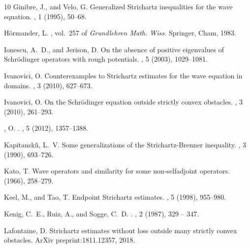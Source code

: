 \documentclass[10pt,leqno]{amsart}
\theoremstyle{definition}%
\theoremstyle{remark}
\numberwithin{equation}{section}
\renewcommand{\^}{\widehat}%
\begin{document}
\begin{thebibliography}{10}
{\sc Ginibre, J., and Velo, G.}
\newblock Generalized {S}trichartz inequalities for the wave equation.
, 1 (1995), 50--68.

{\sc H{\"o}rmander, L.}
, vol.~257 of {\em
  Grundlehren Math. Wiss.}
\newblock Springer, Cham, 1983.

{\sc Ionescu, A.~D., and Jerison, D.}
\newblock On the absence of positive eigenvalues of {S}chr\"{o}dinger operators
  with rough potentials.
, 5 (2003), 1029--1081.

{\sc Ivanovici, O.}
\newblock Counterexamples to {Strichartz} estimates for the wave equation in
  domains.
, 3 (2010), 627--673.

{\sc Ivanovici, O.}
\newblock On the {Schr{\"o}dinger} equation outside strictly convex obstacles.
, 3 (2010), 261--293.

{, O.}
.
, 5 (2012), 1357--1388.

{\sc Kapitanski{\u{\i}}, L.~V.}
\newblock Some generalizations of the {Strichartz}-{Brenner} inequality.
, 3 (1990), 693--726.

{\sc Kato, T.}
\newblock Wave operators and similarity for some non-selfadjoint operators.
 (1966), 258--279.

{\sc Keel, M., and Tao, T.}
\newblock Endpoint {S}trichartz estimates.
, 5 (1998), 955--980.

{\sc Kenig, C.~E., Ruiz, A., and Sogge, C.~D.}
.
, 2 (1987), 329 -- 347.

{\sc Lafontaine, D.}
\newblock Strichartz estimates without loss outside many strictly convex
  obstacles.
\newblock ArXiv preprint:1811.12357, 2018.


\end{thebibliography}
\end{document}
